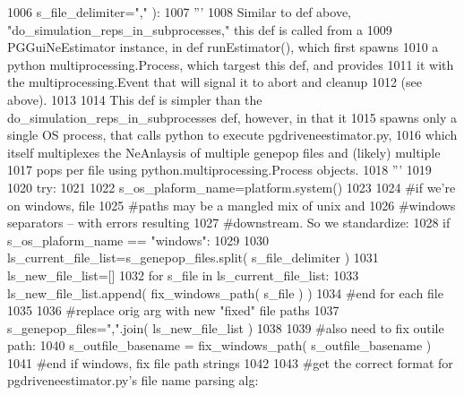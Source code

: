 \begin{DoxyCode}
1006                                         s\_file\_delimiter=\textcolor{stringliteral}{","} ):
1007     \textcolor{stringliteral}{'''}
1008 \textcolor{stringliteral}{    Similar to def above, "do\_simulation\_reps\_in\_subprocesses," this def is called from a}
1009 \textcolor{stringliteral}{    PGGuiNeEstimator instance, in def runEstimator(), which first spawns}
1010 \textcolor{stringliteral}{    a python multiprocessing.Process, which targest this def, and provides}
1011 \textcolor{stringliteral}{    it with the multiprocessing.Event that will signal it to abort and cleanup}
1012 \textcolor{stringliteral}{    (see above).}
1013 \textcolor{stringliteral}{}
1014 \textcolor{stringliteral}{    This def is simpler than the do\_simulation\_reps\_in\_subprocesses def, however, in that it}
1015 \textcolor{stringliteral}{    spawns only a single OS process, that calls python to execute pgdriveneestimator.py,}
1016 \textcolor{stringliteral}{    which itself multiplexes the NeAnlaysis of multiple genepop files and (likely) multiple}
1017 \textcolor{stringliteral}{    pops per file using python.multiprocessing.Process objects.}
1018 \textcolor{stringliteral}{    '''}
1019 
1020     \textcolor{keywordflow}{try}:
1021 
1022         s\_os\_plaform\_name=platform.system()
1023         
1024         \textcolor{comment}{#if we're on windows, file}
1025         \textcolor{comment}{#paths may be a mangled mix of unix and }
1026         \textcolor{comment}{#windows separators -- with errors resulting}
1027         \textcolor{comment}{#downstream.  So we standardize:}
1028         \textcolor{keywordflow}{if} s\_os\_plaform\_name == \textcolor{stringliteral}{"windows"}:
1029 
1030             ls\_current\_file\_list=s\_genepop\_files.split( s\_file\_delimiter )
1031             ls\_new\_file\_list=[]
1032             \textcolor{keywordflow}{for} s\_file \textcolor{keywordflow}{in} ls\_current\_file\_list:
1033                 ls\_new\_file\_list.append( fix\_windows\_path( s\_file ) )
1034             \textcolor{comment}{#end for each file}
1035             
1036             \textcolor{comment}{#replace orig arg with new "fixed" file paths}
1037             s\_genepop\_files=\textcolor{stringliteral}{","}.join( ls\_new\_file\_list )
1038 
1039             \textcolor{comment}{#also need to fix outile path:}
1040             s\_outfile\_basename = fix\_windows\_path( s\_outfile\_basename )
1041         \textcolor{comment}{#end if windows, fix file path strings}
1042 
1043         \textcolor{comment}{#get the correct format for pgdriveneestimator.py's file name parsing alg:}

\end{DoxyCode}
